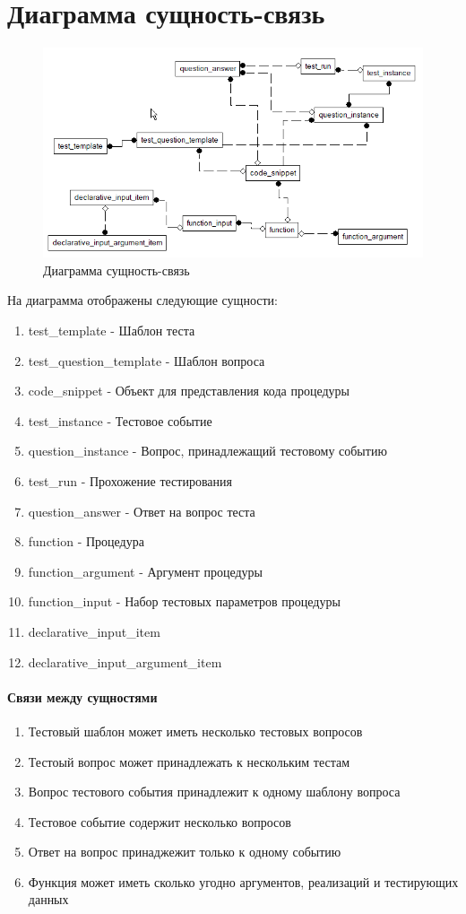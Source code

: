 \documentclass{article}
\begin{document}
\section{Диаграмма сущность-связь}
\begin{figure}[H]
    \includegraphics[width=\textwidth, center]{conceptual.png}
    \caption{Диаграмма сущность-связь}
\end{figure}
На диаграмма отображены следующие сущности:
\begin{enumerate}
    \item test\_template - Шаблон теста
    \item test\_question\_template - Шаблон вопроса
    \item code\_snippet - Объект для представления кода процедуры
    \item test\_instance - Тестовое событие
    \item question\_instance - Вопрос, принадлежащий тестовому
    событию
    \item test\_run - Прохожение тестирования
    \item question\_answer - Ответ на вопрос теста
    \item function - Процедура
    \item function\_argument - Аргумент процедуры
    \item function\_input - Набор тестовых параметров процедуры
    \item declarative\_input\_item
    \item declarative\_input\_argument\_item
\end{enumerate}

\paragraph{Связи между сущностями}
\begin{enumerate}
	\item Тестовый шаблон может иметь несколько тестовых вопросов
	\item Тестоый вопрос может принадлежать к нескольким тестам
	\item Вопрос тестового события принадлежит к одному шаблону вопроса
	\item Тестовое событие содержит несколько вопросов
	\item Ответ на вопрос принаджежит только к одному событию
	\item Функция может иметь сколько угодно аргументов,
	реализаций и тестирующих данных
\end{enumerate}
\end{document}

